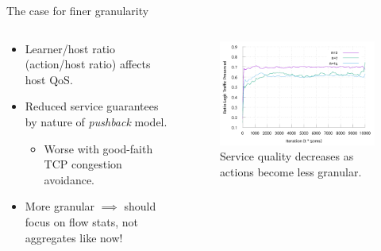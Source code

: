 \documentclass[aspectratio=169,xcolor={dvipsnames}
,hide notes
]{beamer}
\begin{document}
\begin{frame}{The case for finer granularity}
	\begin{columns}
	\begin{column}{0.45\linewidth}
		\begin{itemize}
			\item Learner/host ratio (action/host ratio) affects host QoS.
			
			\item Reduced service guarantees by nature of \emph{pushback} model.
			\begin{itemize}
				\item \alert{Worse with good-faith TCP congestion avoidance}.
			\end{itemize}
			
			\item More granular $\implies$ should focus on flow stats, \alert{not aggregates} like now! %
		\end{itemize}
	\end{column}
	\begin{column}{0.5\linewidth}
		\begin{figure}
			\includegraphics[width=\linewidth]{../plots/online.pdf}
			\caption{Service quality decreases as actions become less granular.}
		\end{figure}
	\end{column}
	\end{columns}
\end{frame}
\end{document}
